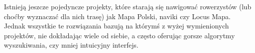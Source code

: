 Istnieją jeszcze pojedyncze projekty, które starają się nawigować rowerzystów (lub choćby wyznaczać dla nich trasę) jak Mapa Polski, naviki czy Locus Mapa. Jednak wszystkie te rozwiązania bazują na którymś z wyżej wymienionych projektów, nie dokładając wiele od siebie, a często oferując gorsze algorytmy wyszukiwania, czy mniej intuicyjny interfejs. 

